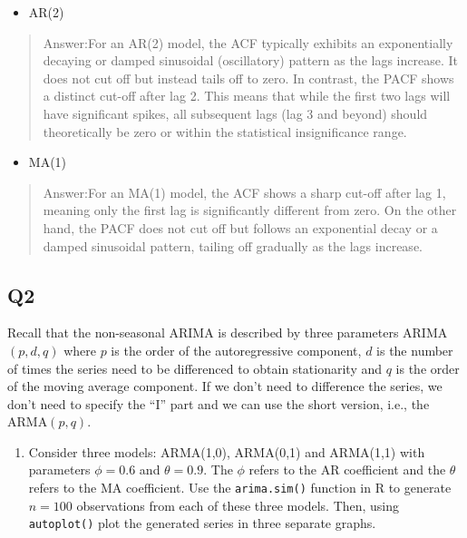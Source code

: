 \documentclass[
]{article}
\providecommand{\tightlist}{%
  \setlength{\itemsep}{0pt}\setlength{\parskip}{0pt}}
\begin{document}
\begin{itemize}
\tightlist
\item
  AR(2)
\end{itemize}

\begin{quote}
Answer:For an AR(2) model, the ACF typically exhibits an exponentially
decaying or damped sinusoidal (oscillatory) pattern as the lags
increase. It does not cut off but instead tails off to zero. In
contrast, the PACF shows a distinct cut-off after lag 2. This means that
while the first two lags will have significant spikes, all subsequent
lags (lag 3 and beyond) should theoretically be zero or within the
statistical insignificance range.
\end{quote}

\begin{itemize}
\tightlist
\item
  MA(1)
\end{itemize}

\begin{quote}
Answer:For an MA(1) model, the ACF shows a sharp cut-off after lag 1,
meaning only the first lag is significantly different from zero. On the
other hand, the PACF does not cut off but follows an exponential decay
or a damped sinusoidal pattern, tailing off gradually as the lags
increase.
\end{quote}

\subsection{Q2}\label{q2}

Recall that the non-seasonal ARIMA is described by three parameters
ARIMA\((p,d,q)\) where \(p\) is the order of the autoregressive
component, \(d\) is the number of times the series need to be
differenced to obtain stationarity and \(q\) is the order of the moving
average component. If we don't need to difference the series, we don't
need to specify the ``I'' part and we can use the short version, i.e.,
the ARMA\((p,q)\).

\begin{enumerate}
\def\labelenumi{(\alph{enumi})}
\tightlist
\item
  Consider three models: ARMA(1,0), ARMA(0,1) and ARMA(1,1) with
  parameters \(\phi=0.6\) and \(\theta= 0.9\). The \(\phi\) refers to
  the AR coefficient and the \(\theta\) refers to the MA coefficient.
  Use the \texttt{arima.sim()} function in R to generate \(n=100\)
  observations from each of these three models. Then, using
  \texttt{autoplot()} plot the generated series in three separate
  graphs.
\end{enumerate}
\end{document}
